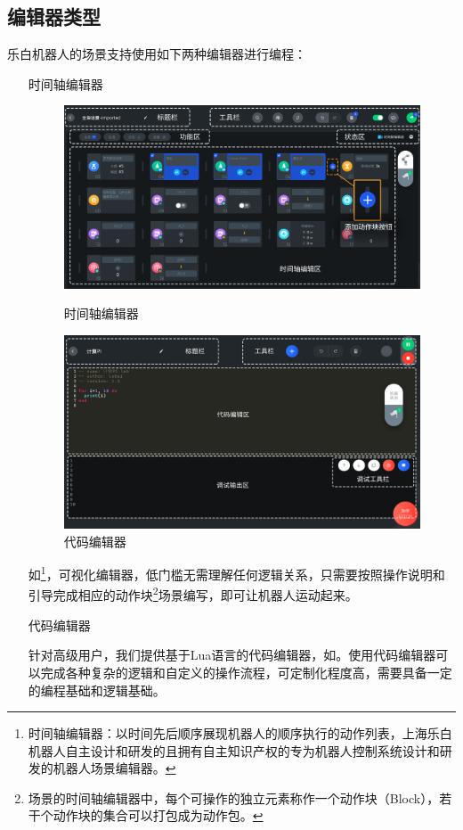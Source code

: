 \subsection{编辑器类型}
乐白机器人的场景支持使用如下两种编辑器进行编程：
\begin{itemize}[leftmargin=6.5em]
	\item [时间轴编辑器]

	\begin{figure}[htb]
		\centering
		\includegraphics[width=\textwidth]{screen/3-1.png}
		\caption{时间轴编辑器}
		\label{fig:时间轴编辑器}

		\includegraphics[width=\textwidth]{screen/3-2.png}
		\caption{代码编辑器}
		\label{fig:代码编辑器}
	\end{figure}

	如\footnote{时间轴编辑器：以时间先后顺序展现机器人的顺序执行的动作列表，上海乐白机器人自主设计和研发的且拥有自主知识产权的专为机器人控制系统设计和研发的机器人场景编辑器。}，可视化编辑器，低门槛无需理解任何逻辑关系，只需要按照操作说明和引导完成相应的动作块\footnote{场景的时间轴编辑器中，每个可操作的独立元素称作一个动作块（Block），若干个动作块的集合可以打包成为动作包。}场景编写，即可让机器人运动起来。

	\item [代码编辑器]

	针对高级用户，我们提供基于Lua语言的代码编辑器，如。使用代码编辑器可以完成各种复杂的逻辑和自定义的操作流程，可定制化程度高，需要具备一定的编程基础和逻辑基础。

\end{itemize}

